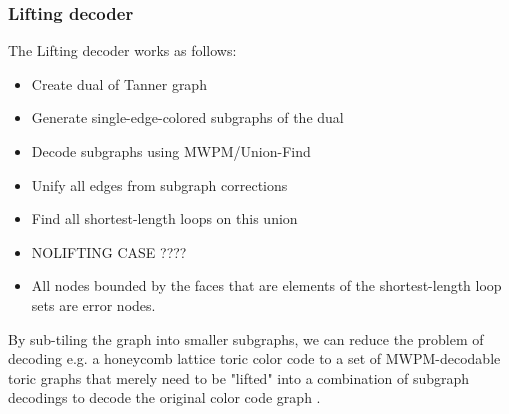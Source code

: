 \subsubsection{Lifting decoder}\label{sec: lifting}
The Lifting decoder works as follows:
\begin{itemize}
    \item Create dual of Tanner graph
    \item Generate single-edge-colored subgraphs of the dual
    \item Decode subgraphs using MWPM/Union-Find
    \item Unify all edges from subgraph corrections
    \item Find all shortest-length loops on this union
    \item NOLIFTING CASE ????
    \item All nodes bounded by the faces that are elements of the shortest-length loop sets
    are error nodes. 
\end{itemize}
By sub-tiling
the graph into smaller subgraphs, we can reduce the problem of decoding
e.g. a honeycomb lattice toric color code to a set of
MWPM-decodable toric graphs that merely need to be "lifted" into a 
combination of subgraph decodings to decode the original color code
graph \cite{delfosse}. 
